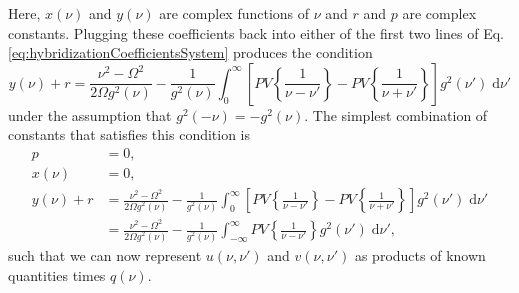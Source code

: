 Here, $x(\nu)$ and $y(\nu)$ are complex functions of $\nu$ and $r$ and $p$ are complex constants. Plugging these coefficients back into either of the first two lines of Eq. \eqref{eq:hybridizationCoefficientsSystem} produces the condition
\begin{equation}
y(\nu) + r = \frac{\nu^2 - \Omega^2}{2\Omega g^2(\nu)} - \frac{1}{g^2(\nu)}\int_0^\infty\left[PV\left\{\frac{1}{\nu - \nu'}\right\} - PV\left\{\frac{1}{\nu + \nu'}\right\}\right]g^2(\nu')\;\mathrm{d}\nu'
\end{equation}
under the assumption that $g^2(-\nu) = -g^2(\nu)$. The simplest combination of constants that satisfies this condition is
\begin{equation}
\begin{split}
p &= 0,\\
x(\nu) &= 0,\\
y(\nu) + r &= \frac{\nu^2 - \Omega^2}{2\Omega g^2(\nu)} - \frac{1}{g^2(\nu)}\int_0^\infty\left[PV\left\{\frac{1}{\nu - \nu'}\right\} - PV\left\{\frac{1}{\nu + \nu'}\right\}\right]g^2(\nu')\;\mathrm{d}\nu'\\
&= \frac{\nu^2 - \Omega^2}{2\Omega g^2(\nu)} - \frac{1}{g^2(\nu)}\int_{-\infty}^\infty PV\left\{\frac{1}{\nu - \nu'}\right\}g^2(\nu')\;\mathrm{d}\nu',
\end{split}
\end{equation}
such that we can now represent $u(\nu,\nu')$ and $v(\nu,\nu')$ as products of known quantities times $q(\nu)$.

